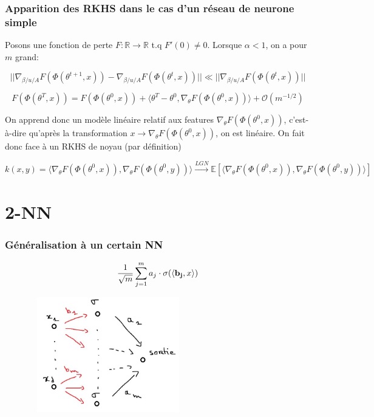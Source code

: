 \documentclass[aspectratio=169]{beamer}
\begin{document}
\begin{frame}
	\frametitle{Apparition des RKHS dans le cas d'un réseau de neurone simple}
	Posons une fonction de perte $F : \mathbb{R} \rightarrow \mathbb{R}$ t.q $F'(0) \neq 0$. Lorsque $\alpha < 1$, on a pour $m$ grand:
	
	\[||\nabla_{\beta / u / A} F(\Phi(\theta^{t+1}, x)) - \nabla_{\beta / u / A} F(\Phi(\theta^{t}, x)) || \ll ||\nabla_{\beta / u / A} F(\Phi(\theta^{t}, x))||\]
	
	\pause
	
	\[F(\Phi(\theta^{T}, x)) = F(\Phi(\theta^{0}, x)) + \langle \theta^{T}-\theta^0 , \nabla_{\theta} F(\Phi(\theta^0, x))  \rangle  + \mathcal{O}(m^{-1/2})\]
	
	\pause
	
	On apprend donc un modèle linéaire relatif aux features $\nabla_{\theta} F(\Phi(\theta^0, x))$, c'est-à-dire qu'après la transformation $x \rightarrow \nabla_{\theta} F(\Phi(\theta^0, x))$, on est linéaire. On fait donc face à un RKHS de noyau (par définition) 
	
	\[k(x,y)=\langle\nabla_{\theta} F(\Phi(\theta^0, x)),\nabla_{\theta} F(\Phi(\theta^0, y))\rangle \stackrel{LGN}{\longrightarrow} \mathbb{E}[\langle\nabla_{\theta} F(\Phi(\theta^0, x)),\nabla_{\theta} F(\Phi(\theta^0, y))\rangle]\]
\end{frame}

\section{2-NN}

\begin{frame}
	\frametitle{Généralisation à un certain NN}
	
	\[ \frac{1}{\sqrt{m}} \sum_{j=1}^{m} a_j \cdot \sigma (\langle {\bf b_j}, x \rangle) \]
	
	\pause
	
	\begin{center}
		\includegraphics[width=9cm, height=5cm]{2nn.jpg} 
	\end{center}
\end{frame}
\end{document}
